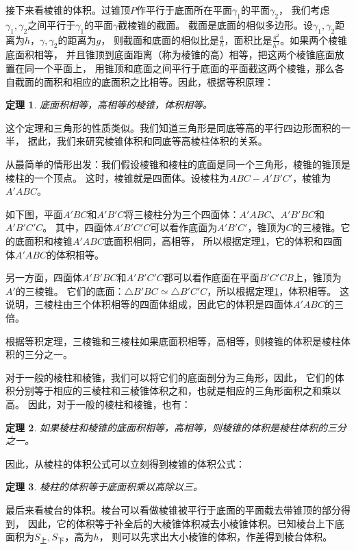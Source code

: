 \documentclass[12pt,UTF8]{ctexbook}
\newtheorem{tm}{定理}[section]
\begin{document}
接下来看棱锥的体积。过锥顶$P$作平行于底面所在平面$\gamma_1$的平面$\gamma_2$，
我们考虑$\gamma_1,\gamma_2$之间平行于$\gamma_1$的平面$\gamma$截棱锥的截面。
截面是底面的相似多边形。设$\gamma_1,\gamma_2$距离为$h$，$\gamma,\gamma_2$的距离为$g$，
则截面和底面的相似比是$\frac{g}{h}$，面积比是$\frac{g^2}{h^2}$。如果两个棱锥底面积相等，
并且锥顶到底面距离（称为棱锥的高）相等，把这两个棱锥底面放置在同一个平面上，
用锥顶和底面之间平行于底面的平面截这两个棱锥，那么各自截面的面积和相应的底面积之比相等。因此，根据等积原理：
\begin{tm}\label{tm:3-2-10}
    底面积相等，高相等的棱锥，体积相等。
\end{tm}
这个定理和三角形的性质类似。我们知道三角形是同底等高的平行四边形面积的一半，
据此，我们来研究棱锥体积和同底等高棱柱体积的关系。

从最简单的情形出发：我们假设棱锥和棱柱的底面是同一个三角形，棱锥的锥顶是棱柱的一个顶点。
这时，棱锥就是四面体。设棱柱为$ABC-A'B'C'$，棱锥为$A'ABC$。

如下图，平面$A'BC$和$A'B'C$将三棱柱分为三个四面体：$A'ABC$、$A'B'BC$和$A'B'C'C$。
其中，四面体$A'B'C'C$可以看作底面为$A'B'C'$，锥顶为$C$的三棱锥。它的底面积和棱锥$A'ABC$底面积相同，高相等，
所以根据定理\ref{tm:3-2-10}，它的体积和四面体$A'ABC$的体积相等。

另一方面，四面体$A'B'BC$和$A'B'C'C$都可以看作底面在平面$B'C'CB$上，锥顶为$A'$的三棱锥。
它们的底面：$\triangle B'BC \simeq \triangle B'C'C$，所以根据定理\ref{tm:3-2-10}，体积相等。
这说明，三棱柱由三个体积相等的四面体组成，因此它的体积是四面体$A'ABC$的三倍。

根据等积定理，三棱锥和三棱柱如果底面积相等，高相等，则棱锥的体积是棱柱体积的三分之一。

对于一般的棱柱和棱锥，我们可以将它们的底面剖分为三角形，因此，
它们的体积分别等于相应的三棱柱和三棱锥体积之和，也就是相应的三角形面积之和乘以高。
因此，对于一般的棱柱和棱锥，也有：
\begin{tm}\label{tm:3-2-20}
    如果棱柱和棱锥的底面积相等，高相等，则棱锥的体积是棱柱体积的三分之一。
\end{tm}
因此，从棱柱的体积公式可以立刻得到棱锥的体积公式：
\begin{tm}\label{tm:3-2-30}
    棱柱的体积等于底面积乘以高除以三。
\end{tm}

最后来看棱台的体积。棱台可以看做棱锥被平行于底面的平面截去带锥顶的部分得到，
因此，它的体积等于补全后的大棱锥体积减去小棱锥体积。已知棱台上下底面积为$S_{\text{上}},S_{\text{下}}$，高为$h$，
则可以先求出大小棱锥的体积，作差得到棱台体积。
\end{document}
